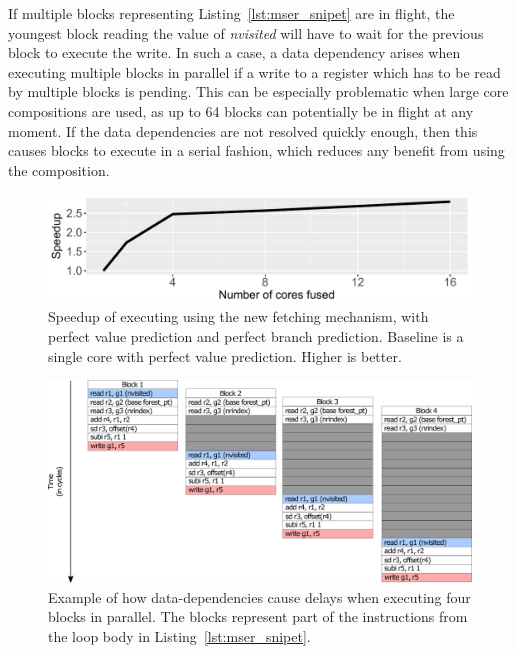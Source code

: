 If multiple blocks representing Listing~\ref{lst:mser_snipet} are in flight, the youngest block reading the value of \textit{nvisited} will have to wait for the previous block to execute the write.
In such a case, a data dependency arises when executing multiple blocks in parallel if a write to a register which has to be read by multiple blocks is pending.
This can be especially problematic when large core compositions are used, as up to 64 blocks can potentially be in flight at any moment.
If the data dependencies are not resolved quickly enough, then this causes blocks to execute in a serial fashion, which reduces any benefit from using the composition.

\begin{figure}[t]
    \centering
    \includegraphics[width=1\textwidth]{chapter3/graphics/mser_motiv_reg.pdf}
    \caption{Speedup of executing  using the new fetching mechanism, with perfect value prediction and perfect branch prediction. Baseline is a single core with perfect value prediction. Higher is better.}
    \label{fig:motivation_reg}
	\vspace{1em}
\end{figure}

\begin{figure}[t]
    \centering
    \includegraphics[width=1\textwidth]{chapter3/graphics/mser_ex.pdf}
    \caption{Example of how data-dependencies cause delays when executing four blocks in parallel. The blocks represent part of the instructions from the loop body in Listing~\ref{lst:mser_snipet}.}
    \label{fig:mser_nvsited}
	\vspace{1em}
\end{figure}

